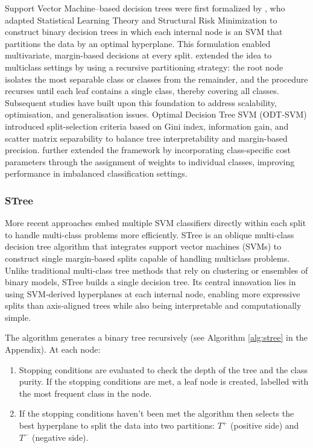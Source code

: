 Support Vector Machine--based decision trees were first formalized by \citet{bennet1998}, who adapted Statistical Learning Theory and Structural Risk Minimization to construct binary decision trees in which each internal node is an SVM that partitions the data by an optimal hyperplane. This formulation enabled multivariate, margin-based decisions at every split. \citet{takahashi2002} extended the idea to multiclass settings by using a recursive partitioning strategy: the root node isolates the most separable class or classes from the remainder, and the procedure recurses until each leaf contains a single class, thereby covering all classes. Subsequent studies have built upon this foundation to address scalability, optimisation, and generalisation issues. Optimal Decision Tree SVM (ODT-SVM) \citep{bala2011} introduced split-selection criteria based on Gini index, information gain, and scatter matrix separability to balance tree interpretability and margin-based precision. \citet{Reynolds2019} further extended the framework by incorporating class-specific cost parameters through the assignment of weights to individual classes, improving performance in imbalanced classification settings.

\subsubsection{STree}\label{stree}

More recent approaches embed multiple SVM classifiers directly within each split to handle multi-class problems more efficiently. STree \citep{stree2021, Montanana2021} is an oblique multi-class decision tree algorithm that integrates support vector machines (SVMs) to construct single margin‑based splits capable of handling multiclass problems. Unlike traditional multi-class tree methods that rely on clustering or ensembles of binary models, STree builds a single decision tree. Its central innovation lies in using SVM‑derived hyperplanes at each internal node, enabling more expressive splits than axis‑aligned trees while also being interpretable and computationally simple.

The algorithm generates a binary tree recursively (see Algorithm \ref{alg:stree} in the Appendix). At each node:

\begin{enumerate}
\def\labelenumi{\arabic{enumi})}
\item
  Stopping conditions are evaluated to check the depth of the tree and the class purity. If the stopping conditions are met, a leaf node is created, labelled with the most frequent class in the node.
\item
  If the stopping conditions haven't been met the algorithm then selects the best hyperplane to split the data into two partitions: \(T^+\) (positive side) and \(T^-\) (negative side).
\end{enumerate}

